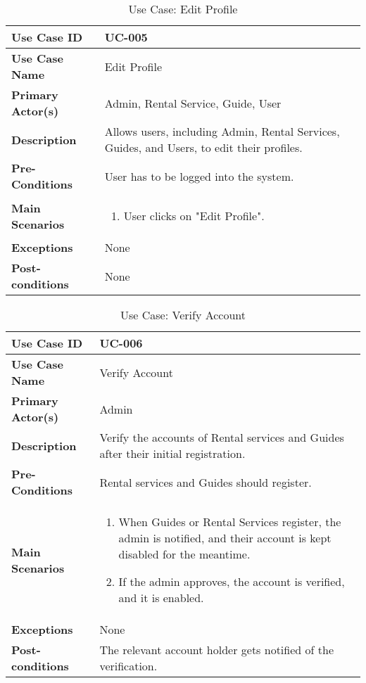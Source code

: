 \begin{table}[ht]
    \centering
    \begin{tabular}{|l|p{}|}
        \hline
        \textbf{Use Case ID} & UC-005 \\
        \hline
        \textbf{Use Case Name} & Edit Profile \\
        \hline
        \textbf{Primary Actor(s)} & Admin, Rental Service, Guide, User \\
        \hline
        \textbf{Description} & Allows users, including Admin, Rental Services, Guides, and Users, to edit their profiles. \\
        \hline
        \textbf{Pre-Conditions} & User has to be logged into the system. \\
        \hline
        \textbf{Main Scenarios} & 
        \begin{enumerate}[label=\arabic*.,itemsep=0pt]
            \item User clicks on "Edit Profile".
        \end{enumerate} \\
        \hline
        \textbf{Exceptions} & None \\
        \hline
        \textbf{Post-conditions} & None \\
        \hline
    \end{tabular}
    \label{tab:use-case-edit-profile}
    \caption{Use Case: Edit Profile}
\end{table}


\begin{table}[ht]
    \centering
    \begin{tabular}{|l|p{}|}
        \hline
        \textbf{Use Case ID} & UC-006 \\
        \hline
        \textbf{Use Case Name} & Verify Account \\
        \hline
        \textbf{Primary Actor(s)} & Admin \\
        \hline
        \textbf{Description} & Verify the accounts of Rental services and Guides after their initial registration. \\
        \hline
        \textbf{Pre-Conditions} & Rental services and Guides should register. \\
        \hline
        \textbf{Main Scenarios} & 
        \begin{enumerate}[label=\arabic*.,itemsep=0pt]
            \item When Guides or Rental Services register, the admin is notified, and their account is kept disabled for the meantime.
            \item If the admin approves, the account is verified, and it is enabled.
        \end{enumerate} \\
        \hline
        \textbf{Exceptions} & None \\
        \hline
        \textbf{Post-conditions} & The relevant account holder gets notified of the verification. \\
        \hline
    \end{tabular}
    \label{tab:use-case-verify-account}
    \caption{Use Case: Verify Account}
\end{table}


